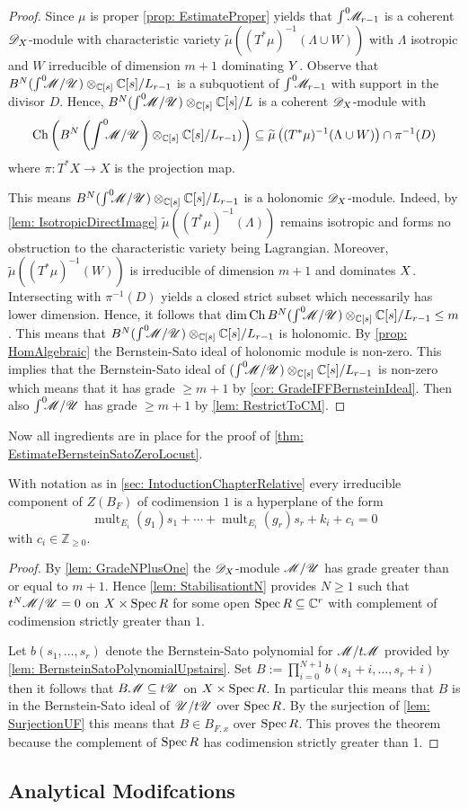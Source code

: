 \begin{proof}
  Since $\mu$ is proper \cref{prop: EstimateProper} yields that $\int^0 \mkern -8mu \mathscr{M}_{r-1}$ is a coherent $\mathscr{D}_X$-module with characteristic variety $\widetilde{\mu}((T^*\mu)^{-1}(\Lambda\cup W))$ with $\Lambda$ isotropic and $W$ irreducible of dimension $m+1$ dominating $Y$.
  Observe that $B^N(\int^0 \mkern -8mu\mathscr{M}/ \mathscr{U})\otimes_{\mathbb{C}[s]}\mathbb{C}[s]/L_{r-1}$ is a subquotient of $\int^0 \mkern -8mu\mathscr{M}_{r-1}$ with support in the divisor $D$.
  Hence, $B^N(\int^0 \mkern -8mu\mathscr{M}/ \mathscr{U})\otimes_{\mathbb{C}[s]}\mathbb{C}[s]/L$ is a coherent $\mathscr{D}_X$-module with
  $$\operatorname{Ch}\left( B^N\left(\int^0 \mkern -8mu\mathscr{M}/ \mathscr{U}\right)\otimes_{\mathbb{C}[s]}\mathbb{C}[s]/L_{r-1}) \right)\subseteq  \widetilde{\mu}\left((T^*\mu)^{-1}(\Lambda\cup W)\right) \cap \pi^{-1}(D)$$
  where $\pi:T^*X\to X$ is the projection map.

  This means $B^N(\int^0 \mkern -8mu\mathscr{M}/ \mathscr{U})\otimes_{\mathbb{C}[s]}\mathbb{C}[s]/L_{r-1}$ is a holonomic $\mathscr{D}_X$-module.
  Indeed, by \cref{lem: IsotropicDirectImage} $\widetilde{\mu}((T^*\mu)^{-1}(\Lambda))$ remains isotropic and forms no obstruction to the characteristic variety being Lagrangian.
  Moreover, $\widetilde{\mu}((T^*\mu)^{-1}(W))$ is irreducible of dimension $m+1$ and dominates $X$.
  Intersecting with $\pi^{-1}(D)$ yields a closed strict subset which necessarily has lower dimension.
  Hence, it follows that $\dim \operatorname{Ch} B^N (\int^0 \mkern -8mu\mathscr{M}/ \mathscr{U})\otimes_{\mathbb{C}[s]}\mathbb{C}[s]/L_{r-1} \leq m$.
  This means that $B^N(\int^0 \mkern -8mu\mathscr{M}/ \mathscr{U})\otimes_{\mathbb{C}[s]}\mathbb{C}[s]/L_{r-1}$ is holonomic.
  By \cref{prop: HomAlgebraic} the Bernstein-Sato ideal of holonomic module is non-zero.
  This implies that the Bernstein-Sato ideal of $(\int^0 \mkern -8mu\mathscr{M}/ \mathscr{U})\otimes_{\mathbb{C}[s]}\mathbb{C}[s]/L_{r-1}$ is non-zero which means that it has grade $\geq m+1$ by \cref{cor: GradeIFFBernsteinIdeal}.
  Then also $\int^0 \mkern -8mu\mathscr{M}/\mathscr{U}$ has grade $\geq m+1$ by \cref{lem: RestrictToCM}.
  \end{proof}
Now all ingredients are in place for the proof of \cref{thm: EstimateBernsteinSatoZeroLocust}.
\begin{theorem}
  With notation as in \cref{sec: IntoductionChapterRelative} every irreducible component of $Z(B_F)$ of codimension $1$ is a hyperplane of the form
  $$\operatorname{mult}_{E_i}(g_1) s_1 + \cdots + \operatorname{mult}_{E_i}(g_r)s_r + k_i + c_i=0$$
  with $c_i \in \mathbb{Z}_{\geq 0 }$.
\end{theorem}
\begin{proof}
  By \cref{lem: GradeNPlusOne} the $\mathscr{D}_X$-module $\mathscr{M}/\mathscr{U}$ has grade greater than or equal to $m + 1$. Hence \cref{lem: StabilisationtN} provides $N\geq 1$ such that $t^N\mathscr{M}/\mathscr{U} = 0$ on $X\times\operatorname{Spec} R$ for some open $\operatorname{Spec} R\subseteq \mathbb{C}^r$ with complement of codimension strictly greater than $1$.

  Let $b(s_1,\ldots,s_r)$ denote the Bernstein-Sato polynomial for $\mathscr{M}/t\mathscr{M}$ provided by \cref{lem: BernsteinSatoPolynomialUpstairs}.
  Set $B := \prod_{i=0}^{N+1} b(s_1 + i, \ldots, s_r + i)$ then it follows that
  $B\mathscr{M} \subseteq t\mathscr{U}$ on $X \times \operatorname{Spec} R$.
  In particular this means that $B$ is in the Bernstein-Sato ideal of $\mathscr{U}/t\mathscr{U}$ over $\operatorname{Spec} R$.
  By the surjection of \cref{lem: SurjectionUF} this means that $B\in B_{F,x}$ over $\operatorname{Spec} R$. This proves the theorem because the complement of $\operatorname{Spec} R$ has codimension strictly greater than 1.
\end{proof}
\subsection{Analytical Modifcations}
